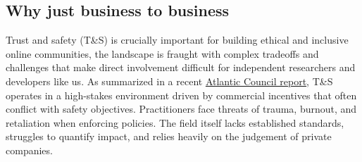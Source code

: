 \subsection{Why just business to business}
Trust and safety (T\&S) is crucially important for building ethical and inclusive online communities, the landscape is fraught with complex tradeoffs and challenges that make direct involvement difficult for independent researchers and developers like us. As summarized in a recent \href{https://www.atlanticcouncil.org/in-depth-research-reports/report/scaling-trust/}{Atlantic Council report}, T\&S operates in a high-stakes environment driven by commercial incentives that often conflict with safety objectives. Practitioners face threats of trauma, burnout, and retaliation when enforcing policies. The field itself lacks established standards, struggles to quantify impact, and relies heavily on the judgement of private companies.
